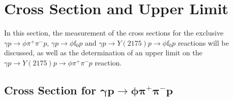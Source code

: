 \begin{comment}
\par In the following we will try to subtract the background underneath the $\phi$ peak. Due to the asymmetry of the background shape on the sides of the $\phi$ peak, the simple side band subtraction will not be appropriate, because it could include an over- or underestimation of the background events.\\
An efficient method will be to study the $K^+K^-$ and $\pi^+\pi^-$ or $\phi \pi^+ \pi^-$ correlations. As an example we will apply the technique on the $\pi^+\pi^-$ invariant mass. The $K^+K^-$ and $\pi^+\pi^-$ correlation is shown on Fig.~\ref{fig.4.4.2}a, we notice the horizontal and vertical bands of the $\phi$(1020) and $\rho$(770) respectively. We project every bin of the $K^+K^-$ invariant mass shown in Fig.~\ref{fig.4.4.2}b, we describe the signal and background shapes, the signal fit parameters used are extracted from the corresponding MC sample. Finally, we look at $\pi^+\pi^-$ invariant mass for the events that contain the $\phi$(1020) signal only. The extracted $\phi$(1020) signal yield (N$_{\phi}$) as a function of the $\pi^+\pi^-$ invariant mass is shown in Fig.~\ref{fig.4.4.2}c, where a small enhancement around 980 GeV/c$^2$ is seen, a detail study of this enhancement will discussed in sections \ref{p.4.5.3} and \ref{p.4.5.4}.

\begin{figure}[H]
    \centering
    \texttt{[image: plots/phi\_scan.png]}
    \caption{\label{fig.4.4.2}$K^+K^-$ versus $\pi^+\pi^-$ invariant mass (a), $K^+K^-$ invariant mass projection in $\pi^+\pi^-$ bins (b) and $\pi^+\pi^-$ $\phi$-mass dependent invariant mass (c).}
\end{figure}

\end{comment}

\section{Cross Section and Upper Limit}
\label{chap.y2175.xsec_ul}

In this section, the measurement of the cross sections for the exclusive $\gamma p \rightarrow \phi \pi^+ \pi^- p$, $\gamma p \rightarrow \phi \mathrm{f}_0 p$ and $\gamma p \rightarrow Y(2175) p \rightarrow \phi \mathrm{f}_0 p$ reactions will be discussed, as well as the determination of an upper limit on the $\gamma p \rightarrow Y(2175) p \rightarrow \phi \pi^+ \pi^- p$ reaction.

\subsection{Cross Section for \texorpdfstring{$\bm{\gamma p \rightarrow \phi \pi^{+} \pi^{-} p}$}{} }
\label{chap.y2175.xsec_ul.phi2pi}

